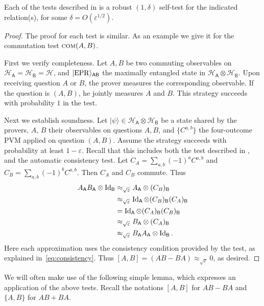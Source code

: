 \documentclass{toc}
\newcommand{\ket}[1]{|#1\rangle}
\newcommand{\Id}{\ensuremath{\mathop{\rm Id}\nolimits}}
\newcommand{\reg}[1]{{\textsf{#1}}}
\newcommand{\mH}{\mathcal{H}}
\newcommand{\eps}{\varepsilon}
\newcommand{\EPR}{{\rm EPR}}
\newcommand{\comt}{\textsc{com}}
\begin{document}
\begin{lemma}\label{lem:elementary}
Each of the tests described in  is a robust $(1,\delta)$ self-test for the indicated relation(s), for some $\delta = O(\eps^{1/2})$. 
\end{lemma}

\begin{proof}
The proof for each test is similar. As an example we give it for the commutation test $\comt(A,B)$. 

First we verify completeness. Let $A,B$ be two commuting observables on $\mH_{\reg{A}} = \mH_{\reg{B}} = \mH$, and $\ket{\EPR}_{\reg{AB}}$ the maximally entangled state in $\mH_\reg{A}\otimes \mH_\reg{B}$. Upon receiving question $A$ or $B$, the prover measures the corresponding observable. If the question is $(A,B)$, he jointly measures $A$ and $B$. This strategy succeeds with probability $1$ in the test. 

Next we establish soundness. Let $\ket{\psi} \in \mH_{\reg{A}}\otimes \mH_\reg{B}$ be a state shared by the provers, $A$, $B$ their observables on questions $A,B$, and $\{C^{a,b}\}$ the four-outcome PVM applied on question $(A,B)$. Assume the strategy succeeds with probability at least $1-\eps$. Recall that this includes both the test described in , and the automatic consistency test. Let $C_A = \sum_{a,b} (-1)^a C^{a,b}$ and $C_B = \sum_{a,b} (-1)^b C^{a,b}$. Then $C_A$ and $C_B$ commute. Thus
\begin{align*}
A_\reg{A} B_\reg{A} \otimes \Id_\reg{B}
&\approx_{\sqrt{\eps}} A_\reg{A} \otimes (C_B)_\reg{B}\\
&\approx_{\sqrt{\eps}} \Id_\reg{A} \otimes (C_B)_\reg{B}(C_A)_\reg{B}\\
&=  \Id_\reg{A} \otimes (C_A)_\reg{B}(C_B)_\reg{B}\\
&\approx_{\sqrt{\eps}} B_\reg{A} \otimes (C_A)_\reg{B}\\
&\approx_{\sqrt{\eps}} B_\reg{A} A_\reg{A} \otimes \Id_\reg{B}.
\end{align*}
Here each approximation uses the consistency condition provided by the test, as explained in~\eqref{eq:consistency}. Thus $[A,B] = (AB-BA) \approx_{\sqrt{\eps}} 0$, as desired. 
\end{proof}

We will often make use of the following simple lemma, which expresses an application of the above tests. Recall the notations $[A,B]$ for $AB-BA$ and $\{A,B\}$ for $AB+BA$. 
\end{document}
